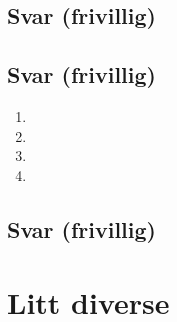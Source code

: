 \documentclass[answers,11pt]{exam}
\begin{document}
\begin{enumerate}[label=\alph*)]
  \newpage
  

  \begin{tcolorbox}
    \subsection*{Svar (frivillig)}

  \end{tcolorbox}

  \newpage
  

  \begin{tcolorbox}
    \subsection*{Svar (frivillig)}

    \begin{enumerate}[label=k\arabic*)]
      \item

      \item
      \item

      \item

    \end{enumerate}

  \end{tcolorbox}

  \newpage
  

  \begin{tcolorbox}
    \subsection*{Svar (frivillig)}

  \end{tcolorbox}

  \newpage
  \section*{Litt diverse}


\end{enumerate}
\end{document}
